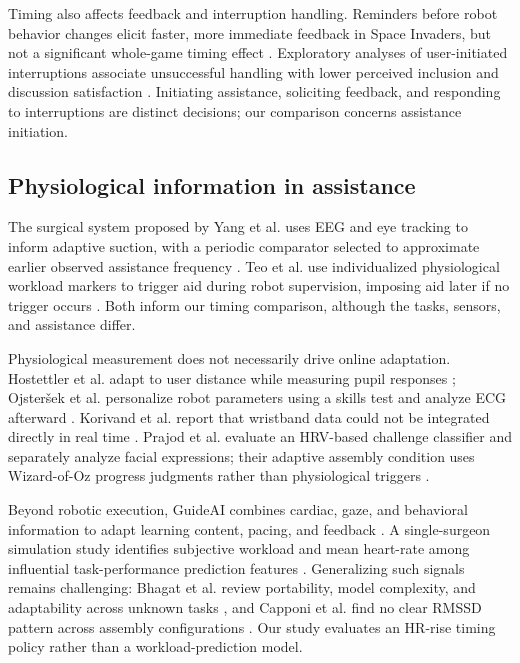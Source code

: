 \documentclass[sigconf,anonymous]{aamas}
\begin{document}
Timing also affects feedback and interruption handling. Reminders before robot behavior changes elicit faster, more immediate feedback in Space Invaders, but not a significant whole-game timing effect \cite{candon2023}. Exploratory analyses of user-initiated interruptions associate unsuccessful handling with lower perceived inclusion and discussion satisfaction \cite{cao2025}. Initiating assistance, soliciting feedback, and responding to interruptions are distinct decisions; our comparison concerns assistance initiation.

\subsection{Physiological information in assistance}

The surgical system proposed by Yang et al. uses EEG and eye tracking to inform adaptive suction, with a periodic comparator selected to approximate earlier observed assistance frequency \cite{yang2024}. Teo et al. use individualized physiological workload markers to trigger aid during robot supervision, imposing aid later if no trigger occurs \cite{teo2018}. Both inform our timing comparison, although the tasks, sensors, and assistance differ.

Physiological measurement does not necessarily drive online adaptation. Hostettler et al. adapt to user distance while measuring pupil responses \cite{hostettler2025}; Ojsteršek et al. personalize robot parameters using a skills test and analyze ECG afterward \cite{ojstersek2024}. Korivand et al. report that wristband data could not be integrated directly in real time \cite{korivand2024}. Prajod et al. evaluate an HRV-based challenge classifier and separately analyze facial expressions; their adaptive assembly condition uses Wizard-of-Oz progress judgments rather than physiological triggers \cite{prajod2024}.

Beyond robotic execution, GuideAI combines cardiac, gaze, and behavioral information to adapt learning content, pacing, and feedback \cite{shukla2026}. A single-surgeon simulation study identifies subjective workload and mean heart-rate among influential task-performance prediction features \cite{wei2025}. Generalizing such signals remains challenging: Bhagat et al. review portability, model complexity, and adaptability across unknown tasks \cite{bhagatsmith2026}, and Capponi et al. find no clear RMSSD pattern across assembly configurations \cite{capponi2024}. Our study evaluates an HR-rise timing policy rather than a workload-prediction model.
\end{document}
